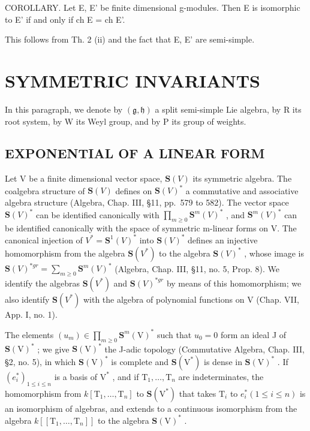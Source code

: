 COROLLARY. Let E, E' be finite dimensional g-modules. Then E is isomorphic to E' if and only if ch E = ch E'.

This follows from Th. 2 (ii) and the fact that E, E' are semi-simple.

\section{SYMMETRIC INVARIANTS}

In this paragraph, we denote by \((\mathfrak{g},\mathfrak{h})\) a split semi-simple Lie algebra, by R its root system, by W its Weyl group, and by P its group of weights.

\subsection{EXPONENTIAL OF A LINEAR FORM}

Let V be a finite dimensional vector space, \(\mathbf{S}(V)\) its symmetric algebra. The coalgebra structure of \(\mathbf{S}(V)\) defines on \(\mathbf{S}(V)^{*}\) a commutative and associative algebra structure (Algebra, Chap. III, §11, pp.~579 to 582). The vector space \(\mathbf{S}(V)^{*}\) can be identified canonically with \(\prod_{m\geq0}\mathbf{S}^{m}(V)^{*}\) , and \(\mathbf{S}^{m}(V)^{*}\) can be identified canonically with the space of symmetric m-linear forms on V. The canonical injection of \(V^{*}=\mathbf{S}^{1}(V)^{*}\) into \(\mathbf{S}(V)^{*}\) defines an injective homomorphism from the algebra \(\mathbf{S}(V^{*})\) to the algebra \(\mathbf{S}(V)^{*}\) , whose image is \(\mathbf{S}(V)^{*gr}=\sum_{m\geq0}\mathbf{S}^{m}(V)^{*}\) (Algebra, Chap. III, §11, no. 5, Prop. 8). We identify the algebras \(\mathbf{S}(V^{*})\) and \(\mathbf{S}(V)^{*gr}\) by means of this homomorphism; we also identify \(\mathbf{S}(V^{*})\) with the algebra of polynomial functions on V (Chap. VII, App. I, no. 1).

The elements \((u_m) \in \prod_{m \geq 0} \mathbf{S}^m(\mathrm{V})^*\) such that \(u_0 = 0\) form an ideal J of \(\mathbf{S}(\mathrm{V})^*\) ; we give \(\mathbf{S}(\mathrm{V})^*\) the J-adic topology (Commutative Algebra, Chap. III, §2, no. 5), in which \(\mathbf{S}(\mathrm{V})^*\) is complete and \(\mathbf{S}(\mathrm{V}^*)\) is dense in \(\mathbf{S}(\mathrm{V})^*\) . If \((e_i^*)_{1 \leq i \leq n}\) is a basis of \(\mathrm{V}^*\) , and if \(\mathrm{T}_1, \ldots, \mathrm{T}_n\) are indeterminates, the homomorphism from \(k[\mathrm{T}_1, \ldots, \mathrm{T}_n]\) to \(\mathbf{S}(\mathrm{V}^*)\) that takes \(\mathrm{T}_i\) to \(e_i^*(1 \leq i \leq n)\) is an isomorphism of algebras, and extends to a continuous isomorphism from the algebra \(k[[\mathrm{T}_1, \ldots, \mathrm{T}_n]]\) to the algebra \(\mathbf{S}(\mathrm{V})^*\) .


